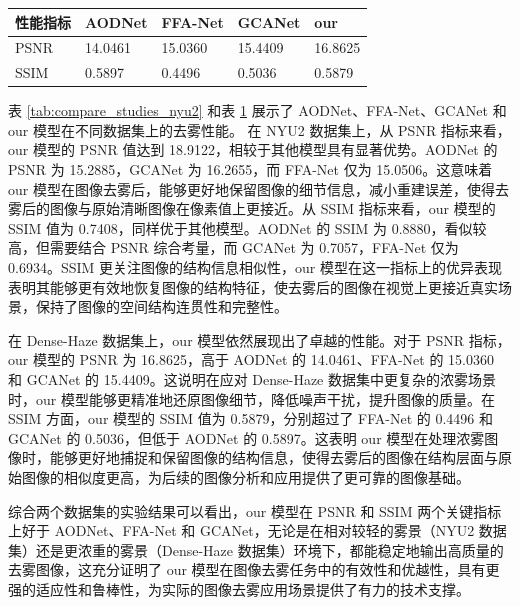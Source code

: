 \begin{table}[H]
    \centering
    \captionsetup{font=footnotesize}
    \label{tab:compare_studies_dh}
    \begin{tabular}{p{}p{}p{}p{}p{}}
        \toprule
        性能指标 & AODNet  & FFA-Net & GCANet  & our   \\ 
        \midrule
        PSNR    & 14.0461 & 15.0360 & 15.4409 & 16.8625 \\
        SSIM    & 0.5897  & 0.4496  & 0.5036  & 0.5879 \\
        \bottomrule
    \end{tabular}
\end{table}

表 \ref{tab:compare_studies_nyu2} 和表 \ref{tab:compare_studies_dh} 展示了 AODNet、FFA-Net、GCANet 和 our 模型在不同数据集上的去雾性能。
在 NYU2 数据集上，从 PSNR 指标来看，our 模型的 PSNR 值达到 18.9122，相较于其他模型具有显著优势。AODNet 的 PSNR 为 15.2885，GCANet 为 16.2655，而 FFA-Net 仅为 15.0506。这意味着 our 模型在图像去雾后，能够更好地保留图像的细节信息，减小重建误差，使得去雾后的图像与原始清晰图像在像素值上更接近。从 SSIM 指标来看，our 模型的 SSIM 值为 0.7408，同样优于其他模型。AODNet 的 SSIM 为 0.8880，看似较高，但需要结合 PSNR 综合考量，而 GCANet 为 0.7057，FFA-Net 仅为 0.6934。SSIM 更关注图像的结构信息相似性，our 模型在这一指标上的优异表现表明其能够更有效地恢复图像的结构特征，使去雾后的图像在视觉上更接近真实场景，保持了图像的空间结构连贯性和完整性。

在 Dense-Haze 数据集上，our 模型依然展现出了卓越的性能。对于 PSNR 指标，our 模型的 PSNR 为 16.8625，高于 AODNet 的 14.0461、FFA-Net 的 15.0360 和 GCANet 的 15.4409。这说明在应对 Dense-Haze 数据集中更复杂的浓雾场景时，our 模型能够更精准地还原图像细节，降低噪声干扰，提升图像的质量。在 SSIM 方面，our 模型的 SSIM 值为 0.5879，分别超过了 FFA-Net 的 0.4496 和 GCANet 的 0.5036，但低于 AODNet 的 0.5897。这表明 our 模型在处理浓雾图像时，能够更好地捕捉和保留图像的结构信息，使得去雾后的图像在结构层面与原始图像的相似度更高，为后续的图像分析和应用提供了更可靠的图像基础。

综合两个数据集的实验结果可以看出，our 模型在 PSNR 和 SSIM 两个关键指标上好于 AODNet、FFA-Net 和 GCANet，无论是在相对较轻的雾景（NYU2 数据集）还是更浓重的雾景（Dense-Haze 数据集）环境下，都能稳定地输出高质量的去雾图像，这充分证明了 our 模型在图像去雾任务中的有效性和优越性，具有更强的适应性和鲁棒性，为实际的图像去雾应用场景提供了有力的技术支撑。

